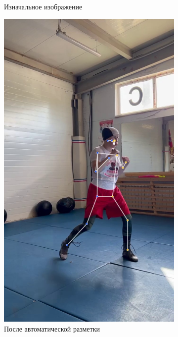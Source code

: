 \begin{figure}[h]
\begin{subfigure}[b]{0.32\textwidth}
	\caption{Изначальное изображение}
\end{subfigure}
\begin{subfigure}[b]{0.32\textwidth}
	\centering
	\includegraphics[width=\textwidth]{./images/experiment/data_info/pose_markup_examples/auto_labeled}
	\caption{После автоматической разметки}
\end{subfigure}
\begin{subfigure}[b]{0.32\textwidth}
	\centering

\end{subfigure}
\end{figure}
